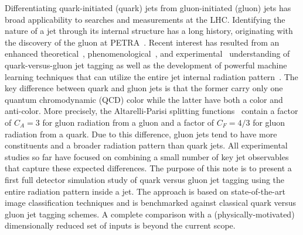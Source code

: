 Differentiating quark-initiated (quark) jets from gluon-initiated (gluon) jets has broad applicability to searches and measurements at the LHC.  Identifying the nature of a jet through its internal structure has a long history, originating with the discovery of the gluon at PETRA~\cite{Bartel:1979ut,Berger:1979cj,Barber:1979yr,Brandelik:1979bd}.  Recent interest has resulted from an enhanced theoretical~\cite{Larkoski:2014pca,Gras:2017jty,Frye:2017yrw}, phenomenological~\cite{Gallicchio:2011xq,Gallicchio:2012ez}, and experimental~\cite{Aad:2014gea,ATLAS-CONF-2016-034,ATL-PHYS-PUB-2017-009,CMS-PAS-JME-13-002,CMS-DP-2016-070} understanding of quark-versus-gluon jet tagging as well as the development of powerful machine learning techniques that can utilize the entire jet internal radiation pattern~\cite{Komiske:2016rsd,Dery:2017fap}.  The key difference between quark and gluon jets is that the former carry only one quantum chromodynamic (QCD) color while the latter have both a color and anti-color.  More precisely, the Altarelli-Parisi splitting functions~\cite{Altarelli:1977zs} contain a factor of $C_A=3$ for gluon radiation from a gluon and a factor of $C_F=4/3$ for gluon radiation from a quark.  Due to this difference, gluon jets tend to have more constituents and a broader radiation pattern than quark jets.  All experimental studies so far have focused on combining a small number of key jet observables that capture these expected differences.  The purpose of this note is to present a first full detector simulation study of quark versus gluon jet tagging using the entire radiation pattern inside a jet.  The approach is based on state-of-the-art image classification techniques and is benchmarked against classical quark versus gluon jet tagging schemes.  A complete comparison with a (physically-motivated) dimensionally reduced set of inputs is beyond the current scope.
